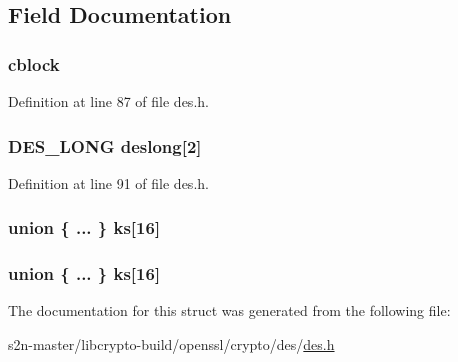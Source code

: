\subsection{Field Documentation}
\subsubsection[{\texorpdfstring{cblock}{cblock}}]{ cblock}\hypertarget{struct_d_e_s__ks_af5531b9badae68320fca1f5efbafd1cb}{}\label{struct_d_e_s__ks_af5531b9badae68320fca1f5efbafd1cb}


Definition at line 87 of file des.\+h.

\subsubsection[{\texorpdfstring{deslong}{deslong}}]{\setlength{\rightskip}{0pt plus 5cm}D\+E\+S\+\_\+\+L\+O\+NG deslong\mbox{[}2\mbox{]}}\hypertarget{struct_d_e_s__ks_aec2698bc0fb4b7ada132f0e3830da9a5}{}\label{struct_d_e_s__ks_aec2698bc0fb4b7ada132f0e3830da9a5}


Definition at line 91 of file des.\+h.

\subsubsection[{\texorpdfstring{ks}{ks}}]{\setlength{\rightskip}{0pt plus 5cm}union \{ ... \}   ks\mbox{[}16\mbox{]}}\hypertarget{struct_d_e_s__ks_a95d06efd348c01f8d5575ad4a3e0723a}{}\label{struct_d_e_s__ks_a95d06efd348c01f8d5575ad4a3e0723a}
\subsubsection[{\texorpdfstring{ks}{ks}}]{\setlength{\rightskip}{0pt plus 5cm}union \{ ... \}   ks\mbox{[}16\mbox{]}}\hypertarget{struct_d_e_s__ks_a410c4c66747b8399b2c3b0887c8a6701}{}\label{struct_d_e_s__ks_a410c4c66747b8399b2c3b0887c8a6701}


The documentation for this struct was generated from the following file\+:\begin{DoxyCompactItemize}
\item 
s2n-\/master/libcrypto-\/build/openssl/crypto/des/\hyperlink{crypto_2des_2des_8h}{des.\+h}\end{DoxyCompactItemize}
